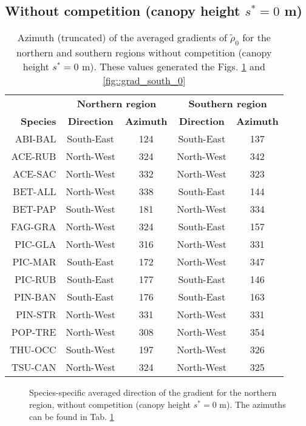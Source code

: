 \documentclass[letterpaper, 12pt]{article}
\newcommand {\s}{{s}^{*}}
\theoremstyle{theo}
\begin{document}
\begin{refsection}
\begin{onehalfspace}
	\subsection{Without competition (canopy height $ \s = 0 $ m)}
	\begin{table}[ht]
	\centering
	\caption{Azimuth (truncated) of the averaged gradients of $ \tilde \rho_0 $ for the northern and southern regions without competition (canopy height $ \s = 0 $ m). These values generated the Figs. \ref{fig::grad_north_0} and \ref{fig::grad_south_0} \label{tab::azimuth_0}}
	\begin{tabular}{rcccc}
		\toprule
		~ & \multicolumn{2}{c}{\textbf{Northern region}} & \multicolumn{2}{c}{\textbf{Southern region}} \\
		\cmidrule(lr){2-3} \cmidrule(lr){4-5}
		\textbf{Species} & \textbf{Direction} & \textbf{Azimuth} & \textbf{Direction} & \textbf{Azimuth} \\
		\midrule
			ABI-BAL & South-East & 124 & South-East & 137 \\
			ACE-RUB & North-West & 324 & North-West & 342 \\
			ACE-SAC & North-West & 332 & North-West & 323 \\
			BET-ALL & North-West & 338 & South-East & 144 \\
			BET-PAP & South-West & 181 & North-West & 334 \\
			FAG-GRA & North-West & 324 & South-East & 157 \\
			PIC-GLA & North-West & 316 & North-West & 331 \\
			PIC-MAR & South-East & 172 & North-West & 347 \\
			PIC-RUB & South-East & 177 & South-East & 146 \\
			PIN-BAN & South-East & 176 & South-East & 163 \\
			PIN-STR & North-West & 331 & North-West & 331 \\
			POP-TRE & North-West & 308 & North-West & 354 \\
			THU-OCC & South-West & 197 & North-West & 326 \\
			TSU-CAN & North-West & 324 & North-West & 325 \\
		\bottomrule
	\end{tabular}
	\end{table}
	
	\begin{figure}
		\centering
		
		\caption{Species-specific averaged direction of the gradient for the northern region, without competition (canopy height $ \s = 0 $ m). The azimuths can be found in Tab. \ref{tab::azimuth_0} \label{fig::grad_north_0}}
	\end{figure}
	

\end{onehalfspace}
\end{refsection}
\end{document}
